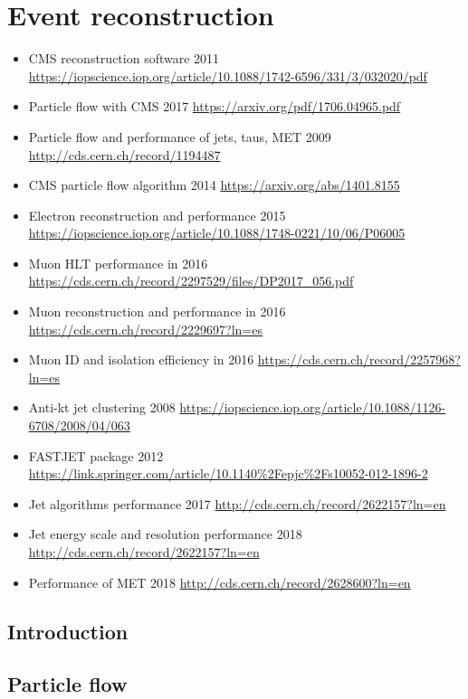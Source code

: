 \chapter{Event reconstruction}\label{chap:reconstruction}


\begin{itemize}
    \item CMS reconstruction software 2011
    \url{https://iopscience.iop.org/article/10.1088/1742-6596/331/3/032020/pdf}
    \item Particle flow with CMS 2017 \url{https://arxiv.org/pdf/1706.04965.pdf}
    \item Particle flow and performance of jets, taus, MET 2009
    \url{http://cds.cern.ch/record/1194487}
    \item CMS particle flow algorithm 2014 \url{https://arxiv.org/abs/1401.8155}
    \item Electron reconstruction and performance 2015
    \url{https://iopscience.iop.org/article/10.1088/1748-0221/10/06/P06005}
    \item Muon HLT performance in 2016 \url{https://cds.cern.ch/record/2297529/files/DP2017_056.pdf}
    \item Muon reconstruction and performance in 2016 \url{https://cds.cern.ch/record/2229697?ln=es}
    \item Muon ID and isolation efficiency in 2016 \url{https://cds.cern.ch/record/2257968?ln=es}
    \item Anti-kt jet clustering 2008
    \url{https://iopscience.iop.org/article/10.1088/1126-6708/2008/04/063}
    \item FASTJET package 2012 \url{https://link.springer.com/article/10.1140\%2Fepjc\%2Fs10052-012-1896-2}
    \item Jet algorithms performance 2017 \url{http://cds.cern.ch/record/2622157?ln=en}
    \item Jet energy scale and resolution performance 2018 \url{http://cds.cern.ch/record/2622157?ln=en}
    \item Performance of MET 2018 \url{http://cds.cern.ch/record/2628600?ln=en}
\end{itemize}

\section{Introduction}

\section{Particle flow}


